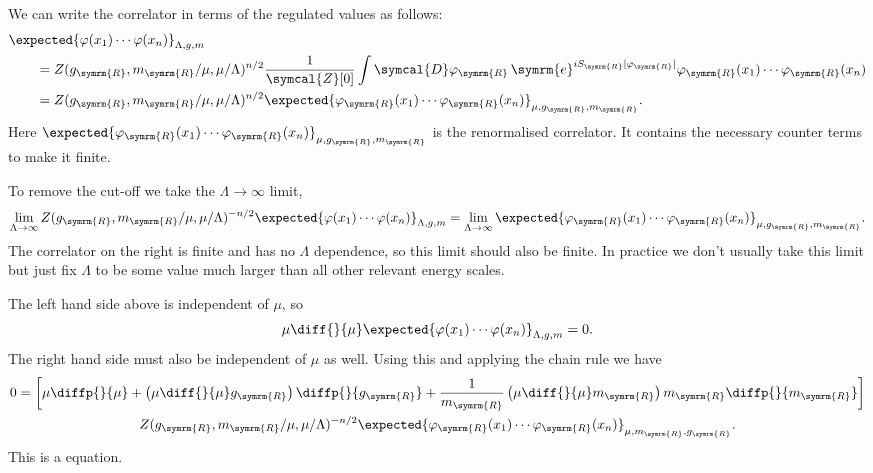 \documentclass[fleqn]{NotesClass}
\newcommand{\e}{\symrm{e}}
\newcommand{\DL}[1]{\symcal{D}#1}
\newcommand{\renormalised}{\symrm{R}}
\begin{document}
    We can write the correlator in terms of the regulated values as follows:
    \begin{align}
        &\expected{\varphi(x_1) \dotsm \varphi(x_n)}_{\Lambda, g, m}\\
        &\qquad= Z(g_{\renormalised}, m_{\renormalised}/\mu, \mu/\Lambda)^{n/2} \frac{1}{\symcal{Z}[0]} \int \DL{\varphi_{\renormalised}} \, \e^{iS_{\renormalised}[\varphi_{\renormalised}]} \varphi_{\renormalised}(x_1) \dotsm \varphi_{\renormalised}(x_n)\\
        &\qquad= Z(g_{\renormalised}, m_{\renormalised}/\mu, \mu/\Lambda)^{n/2} \expected{\varphi_{\renormalised}(x_1) \dotsm \varphi_{\renormalised}(x_n)}_{\mu, g_{\renormalised}, m_{\renormalised}}.
    \end{align}
    Here \(\expected{\varphi_{\renormalised}(x_1) \dotsm \varphi_{\renormalised}(x_n)}_{\mu, g_{\renormalised}, m_{\renormalised}}\) is the renormalised correlator.
    It contains the necessary counter terms to make it finite.
    
    To remove the cut-off we take the \(\Lambda \to \infty\) limit,
    \begin{equation}
        \lim_{\Lambda \to \infty} Z(g_{\renormalised}, m_{\renormalised}/\mu, \mu/\Lambda)^{-n/2} \expected{\varphi(x_1) \dotsm \varphi(x_n)}_{\Lambda, g, m} = \lim_{\Lambda \to \infty} \expected{\varphi_{\renormalised}(x_1) \dotsm \varphi_{\renormalised}(x_n)}_{\mu, g_{\renormalised}, m_{\renormalised}}.
    \end{equation}
    The correlator on the right is finite and has no \(\Lambda\) dependence, so this limit should also be finite.
    In practice we don't usually take this limit but just fix \(\Lambda\) to be some value much larger than all other relevant energy scales.
    
    The left hand side above is independent of \(\mu\), so
    \begin{equation}
        \mu \diff{}{\mu} \expected{\varphi(x_1) \dotsm \varphi(x_n)}_{\Lambda, g, m} = 0.
    \end{equation}
    The right hand side must also be independent of \(\mu\) as well.
    Using this and applying the chain rule we have
    \begin{multline}
        0 = \left[ \mu \diffp{}{\mu} + \left( \mu \diff{}{\mu} g_{\renormalised} \right) \diffp{}{g_{\renormalised}} + \frac{1}{m_{\renormalised}} \left( \mu \diff{}{\mu} m_{\renormalised} \right) m_{\renormalised} \diffp{}{m_{\renormalised}} \right]\\
        Z(g_{\renormalised}, m_{\renormalised}/\mu, \mu/\Lambda)^{-n/2} \expected{\varphi_{\renormalised}(x_1) \dotsm \varphi_{\renormalised}(x_n)}_{\mu, m_{\renormalised}, g_{\renormalised}}.
    \end{multline}
    This is a  equation.
    
\end{document}
